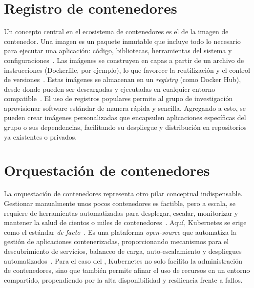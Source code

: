 \section{Registro de contenedores}
Un concepto central en el ecosistema de contenedores es el de la imagen de contenedor. Una imagen es un paquete inmutable que incluye todo lo necesario para ejecutar una aplicación: código, bibliotecas, herramientas del sistema y configuraciones~\citep{straesser2023empirical}. Las imágenes se construyen en capas a partir de un archivo de instrucciones (Dockerfile, por ejemplo), lo que favorece la reutilización y el control de versiones~\citep{dahlmanns2023secrets}. Estas imágenes se almacenan en un \textit{registry} (como Docker Hub), desde donde pueden ser descargadas y ejecutadas en cualquier entorno compatible~\citep{anwar2018improving}. El uso de registros populares permite al grupo de investigación aprovisionar software estándar de manera rápida y sencilla. Agregando a esto, se pueden crear imágenes personalizadas que encapsulen aplicaciones específicas del grupo o sus dependencias, facilitando su despliegue y distribución en repositorios ya existentes o privados.

\section{Orquestación de contenedores}
La orquestación de contenedores representa otro pilar conceptual indispensable. Gestionar manualmente unos pocos contenedores es factible, pero a escala, se requiere de herramientas automatizadas para desplegar, escalar, monitorizar y mantener la salud de cientos o miles de contenedores~\citep{al2019container}. Aquí, Kubernetes se erige como el estándar \textit{de facto}~\citep{zhou2021container}. Es una plataforma \textit{open-source} que automatiza la gestión de aplicaciones contenerizadas, proporcionando mecanismos para el descubrimiento de servicios, balanceo de carga, auto-escalamiento y despliegues automatizados~\citep{carrion2022kubernetes}. Para el caso del \GRID, Kubernetes no solo facilita la administración de contenedores, sino que también permite afinar el uso de recursos en un entorno compartido, propendiendo por la alta disponibilidad y resiliencia frente a fallos.

